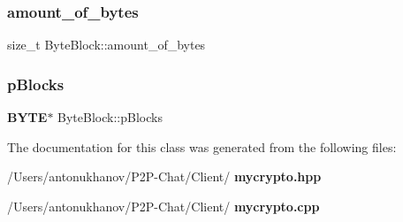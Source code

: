 \subsubsection{amount\+\_\+of\+\_\+bytes}
{\footnotesize\ttfamily size\+\_\+t Byte\+Block\+::amount\+\_\+of\+\_\+bytes\hspace{0.3cm}{\ttfamily [private]}}

\mbox{\label{class_byte_block_a9cc668dbb2b3562e1b72b2265f3bc077}} 
\subsubsection{p\+Blocks}
{\footnotesize\ttfamily \textbf{ B\+Y\+TE}$\ast$ Byte\+Block\+::p\+Blocks\hspace{0.3cm}{\ttfamily [private]}}



The documentation for this class was generated from the following files\+:\begin{DoxyCompactItemize}
\item 
/\+Users/antonukhanov/\+P2\+P-\/\+Chat/\+Client/\textbf{ mycrypto.\+hpp}\item 
/\+Users/antonukhanov/\+P2\+P-\/\+Chat/\+Client/\textbf{ mycrypto.\+cpp}\end{DoxyCompactItemize}

